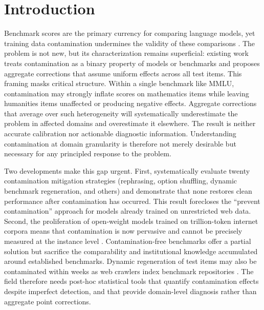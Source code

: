 \section{Introduction}\label{sec:introduction}

Benchmark scores are the primary currency for comparing language models, yet training data contamination undermines the validity of these comparisons \citep{hendrycks2021mmlu,chang2025benchmarking}. The problem is not new, but its characterization remains superficial: existing work treats contamination as a binary property of models or benchmarks and proposes aggregate corrections that assume uniform effects across all test items. This framing masks critical structure. Within a single benchmark like MMLU, contamination may strongly inflate scores on mathematics items while leaving humanities items unaffected or producing negative effects. Aggregate corrections that average over such heterogeneity will systematically underestimate the problem in affected domains and overestimate it elsewhere. The result is neither accurate calibration nor actionable diagnostic information. Understanding contamination at domain granularity is therefore not merely desirable but necessary for any principled response to the problem.

Two developments make this gap urgent. First, \citet{sun2025emperor} systematically evaluate twenty contamination mitigation strategies (rephrasing, option shuffling, dynamic benchmark regeneration, and others) and demonstrate that none restores clean performance after contamination has occurred. This result forecloses the ``prevent contamination'' approach for models already trained on unrestricted web data. Second, the proliferation of open-weight models trained on trillion-token internet corpora means that contamination is now pervasive and cannot be precisely measured at the instance level \citep{oren2024proving}. Contamination-free benchmarks \citep{white2024livebench} offer a partial solution but sacrifice the comparability and institutional knowledge accumulated around established benchmarks. Dynamic regeneration of test items may also be contaminated within weeks as web crawlers index benchmark repositories \citep{dong_2024_cdd}. The field therefore needs post-hoc statistical tools that quantify contamination effects despite imperfect detection, and that provide domain-level diagnosis rather than aggregate point corrections.

